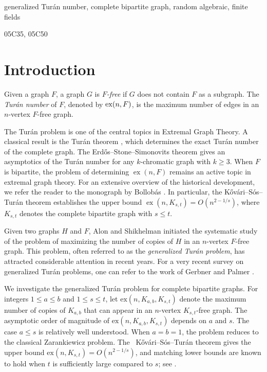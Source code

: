 \documentclass[11pt,a4paper]{article}
\theoremstyle{definition}
\theoremstyle{remark}
\newcommand{\ex}{\operatorname{ex}}
\begin{document}
{ generalized Tur\'{a}n number, complete bipartite graph, random algebraic, finite fields}  

{ 05C35, 05C50}


\setcounter{footnote}{0}
\renewcommand{\thefootnote}{}



\section{Introduction}
Given a graph $F$, a graph $G$ is \textit{$F$-free} if $G$ does not contain $F$ as a subgraph. The \textit{Tur\'{a}n number} of $F$, denoted by ${\rm{ex}}(n,F)$, is the maximum number of edges in an $n$-vertex $F$-free graph. 

The Tur\'{a}n problem is one of the central topics in Extremal Graph Theory. 
A classical result is the Tur\'{a}n theorem \cite{Tu}, which determines the exact Tur\'{a}n number of the complete graph. %
The Erd\H{o}s--Stone--Simonovits theorem \cite{ESi,ESt} gives an asymptotics of the Tur\'{a}n number for any $k$-chromatic graph with $k\geq3$. 
When $F$ is bipartite, the problem of determining $\ex(n,F)$ remains an active topic in extremal graph theory. For an extensive overview of the historical development, we refer the reader to the monograph by Bollob\'{a}s \cite{Bo}. In particular, the K\H{o}v\'{a}ri--S\'{o}s--Tur\'{a}n theorem \cite{Ko-So-Tu} establishes the upper bound $\ex(n, K_{s,t}) = O(n^{2-1/s})$, where $K_{s,t}$ denotes the complete bipartite graph with $s\le t$. 

Given two graphs $H$ and $F$, Alon and Shikhelman \cite{alon2016many} initiated the systematic study of the problem of maximizing the number of copies of $H$ in an $n$-vertex $F$-free graph. This problem, often referred to as the \textit{generalized Tur\'{a}n problem}, has attracted considerable attention in recent years. For a very recent survey on generalized Tur\'{a}n problems, one can refer to the work of Gerbner and Palmer \cite{GePa}. 

We investigate the generalized Tur\'{a}n problem for complete bipartite graphs. For integers $1 \le a \le b$ and $1 \le s \le t$, let $\mathrm{ex}(n, K_{a,b}, K_{s,t})$ denote the maximum number of copies of $K_{a,b}$ that can appear in an $n$-vertex $K_{s,t}$-free graph. The asymptotic order of magnitude of $\mathrm{ex}(n, K_{a,b}, K_{s,t})$ depends  on  $a$ and $s$.
The case $a \le s$ is relatively well understood.
When $a = b = 1$,  the problem reduces to the classical Zarankiewicz problem.
The \ K\H{o}v\'{a}ri--S\'{o}s--Tur\'{a}n theorem \cite{Ko-So-Tu} gives the upper bound $\mathrm{ex}(n, K_{s,t}) = O(n^{2-1/s})$, and matching lower bounds are known to hold when $t$ is sufficiently large compared to $s$; see \cite{Kol, alon1999, Buk}.
\end{document}

